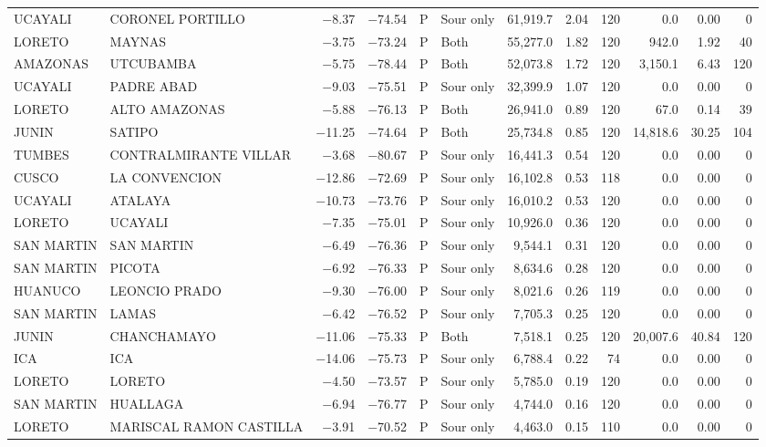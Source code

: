 \begin{landscape}
\begin{longtable}{llrrclrrrrrr}
UCAYALI & CORONEL PORTILLO & $-$8.37 & $-$74.54 & P & Sour only & 61,919.7 & 2.04 & 120 & 0.0 & 0.00 & 0 \\
LORETO & MAYNAS & $-$3.75 & $-$73.24 & P & Both & 55,277.0 & 1.82 & 120 & 942.0 & 1.92 & 40 \\
AMAZONAS & UTCUBAMBA & $-$5.75 & $-$78.44 & P & Both & 52,073.8 & 1.72 & 120 & 3,150.1 & 6.43 & 120 \\
UCAYALI & PADRE ABAD & $-$9.03 & $-$75.51 & P & Sour only & 32,399.9 & 1.07 & 120 & 0.0 & 0.00 & 0 \\
LORETO & ALTO AMAZONAS & $-$5.88 & $-$76.13 & P & Both & 26,941.0 & 0.89 & 120 & 67.0 & 0.14 & 39 \\
JUNIN & SATIPO & $-$11.25 & $-$74.64 & P & Both & 25,734.8 & 0.85 & 120 & 14,818.6 & 30.25 & 104 \\
TUMBES & CONTRALMIRANTE VILLAR & $-$3.68 & $-$80.67 & P & Sour only & 16,441.3 & 0.54 & 120 & 0.0 & 0.00 & 0 \\
CUSCO & LA CONVENCION & $-$12.86 & $-$72.69 & P & Sour only & 16,102.8 & 0.53 & 118 & 0.0 & 0.00 & 0 \\
UCAYALI & ATALAYA & $-$10.73 & $-$73.76 & P & Sour only & 16,010.2 & 0.53 & 120 & 0.0 & 0.00 & 0 \\
LORETO & UCAYALI & $-$7.35 & $-$75.01 & P & Sour only & 10,926.0 & 0.36 & 120 & 0.0 & 0.00 & 0 \\
SAN MARTIN & SAN MARTIN & $-$6.49 & $-$76.36 & P & Sour only & 9,544.1 & 0.31 & 120 & 0.0 & 0.00 & 0 \\
SAN MARTIN & PICOTA & $-$6.92 & $-$76.33 & P & Sour only & 8,634.6 & 0.28 & 120 & 0.0 & 0.00 & 0 \\
HUANUCO & LEONCIO PRADO & $-$9.30 & $-$76.00 & P & Sour only & 8,021.6 & 0.26 & 119 & 0.0 & 0.00 & 0 \\
SAN MARTIN & LAMAS & $-$6.42 & $-$76.52 & P & Sour only & 7,705.3 & 0.25 & 120 & 0.0 & 0.00 & 0 \\
JUNIN & CHANCHAMAYO & $-$11.06 & $-$75.33 & P & Both & 7,518.1 & 0.25 & 120 & 20,007.6 & 40.84 & 120 \\
ICA & ICA & $-$14.06 & $-$75.73 & P & Sour only & 6,788.4 & 0.22 & 74 & 0.0 & 0.00 & 0 \\
LORETO & LORETO & $-$4.50 & $-$73.57 & P & Sour only & 5,785.0 & 0.19 & 120 & 0.0 & 0.00 & 0 \\
SAN MARTIN & HUALLAGA & $-$6.94 & $-$76.77 & P & Sour only & 4,744.0 & 0.16 & 120 & 0.0 & 0.00 & 0 \\
LORETO & MARISCAL RAMON CASTILLA & $-$3.91 & $-$70.52 & P & Sour only & 4,463.0 & 0.15 & 110 & 0.0 & 0.00 & 0 \\

\end{longtable}
\end{landscape}
